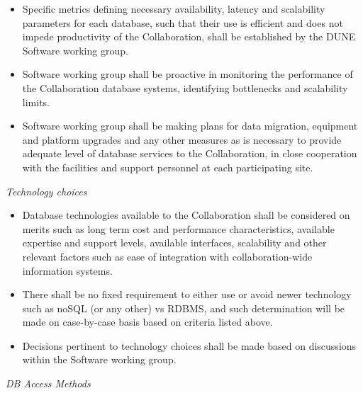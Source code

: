 \begin{itemize}
\item Specific metrics defining necessary availability, latency and scalability parameters for each database, such that their use is efficient and does not impede productivity of the Collaboration,  shall be established by the DUNE Software working group.

\item Software working group shall be proactive in monitoring the performance of the Collaboration database systems, identifying bottlenecks and scalability limits.

\item Software working group shall be making plans for data migration, equipment and platform upgrades and any other measures as is 
necessary to provide adequate level of database services to the Collaboration, in close cooperation with the facilities 
and support personnel at each participating site.
\end{itemize}
\noindent
\textit{Technology choices}
\begin{itemize}
\item Database technologies available to the Collaboration shall be considered on merits such as long term cost and 
performance characteristics, available expertise and support levels, available interfaces, scalability and other relevant 
factors such as ease of integration with collaboration-wide information systems.

\item There shall be no fixed requirement to either use or avoid newer technology such as noSQL (or any other) vs RDBMS, 
and such determination will be made on case-by-case basis based on criteria listed above.


\item Decisions pertinent to technology choices shall be made based on discussions within the Software working group.
\end{itemize}
\noindent
\textit{DB Access Methods}

